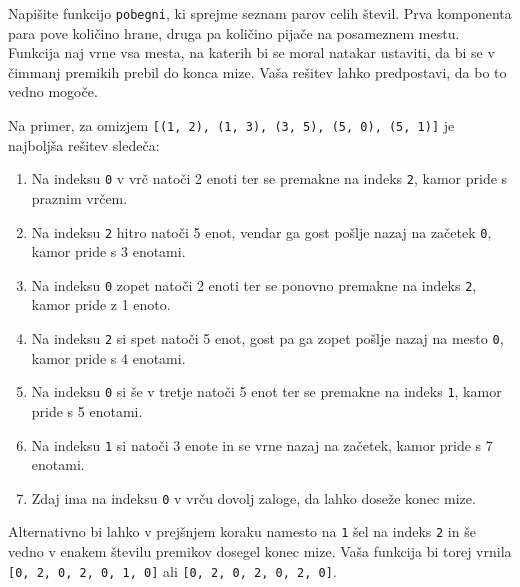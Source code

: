 \documentclass[arhiv]{../izpit}
\begin{document}
Napišite funkcijo \verb|pobegni|, ki sprejme seznam parov celih števil. Prva komponenta para pove količino hrane, druga pa količino pijače na posameznem mestu. Funkcija naj vrne vsa mesta, na katerih bi se moral natakar ustaviti, da bi se v čimmanj premikih prebil do konca mize. Vaša rešitev lahko predpostavi, da bo to vedno mogoče.

Na primer, za omizjem \verb|[(1, 2), (1, 3), (3, 5), (5, 0), (5, 1)]| je najboljša rešitev sledeča:
\begin{enumerate}
  \item Na indeksu \verb|0| v vrč natoči 2 enoti ter se premakne na indeks \verb|2|, kamor pride s praznim vrčem.
  \item Na indeksu \verb|2| hitro natoči 5 enot, vendar ga gost pošlje nazaj na začetek \verb|0|, kamor pride s 3 enotami.
  \item Na indeksu \verb|0| zopet natoči 2 enoti ter se ponovno premakne na indeks \verb|2|, kamor pride z 1 enoto.
  \item Na indeksu \verb|2| si spet natoči 5 enot, gost pa ga zopet pošlje nazaj na mesto \verb|0|, kamor pride s 4 enotami.
  \item Na indeksu \verb|0| si še v tretje natoči 5 enot ter se premakne na indeks \verb|1|, kamor pride s 5 enotami.
  \item Na indeksu \verb|1| si natoči 3 enote in se vrne nazaj na začetek, kamor pride s 7 enotami.
  \item Zdaj ima na indeksu \verb|0| v vrču dovolj zaloge, da lahko doseže konec mize.
\end{enumerate}
Alternativno bi lahko v prejšnjem koraku namesto na \verb|1| šel na indeks \verb|2| in še vedno v enakem številu premikov dosegel konec mize. Vaša funkcija bi torej vrnila \verb|[0, 2, 0, 2, 0, 1, 0]| ali \verb|[0, 2, 0, 2, 0, 2, 0]|.
\end{document}
